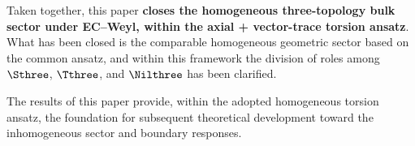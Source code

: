 Taken together, this paper \textbf{closes the homogeneous three-topology bulk
sector under EC--Weyl, within the axial + vector-trace torsion ansatz}.  What
has been closed is the comparable homogeneous geometric sector based on the
common ansatz, and within this framework the division of roles among $\Sthree$,
$\Tthree$, and $\Nilthree$ has been clarified.

The results of this paper provide, within the adopted homogeneous torsion
ansatz, the foundation for subsequent theoretical development toward the
inhomogeneous sector and boundary responses.
